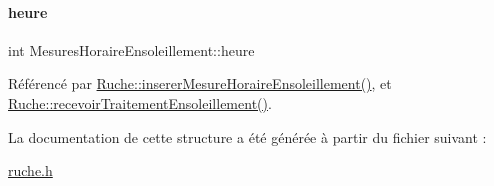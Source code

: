 \paragraph{\texorpdfstring{heure}{heure}}
{\footnotesize\ttfamily int Mesures\+Horaire\+Ensoleillement\+::heure}



Référencé par \hyperlink{class_ruche_a658234b9d96541d204b95b74556742b6}{Ruche\+::inserer\+Mesure\+Horaire\+Ensoleillement()}, et \hyperlink{class_ruche_a2ac5766ce8652084f034c498691488ea}{Ruche\+::recevoir\+Traitement\+Ensoleillement()}.



La documentation de cette structure a été générée à partir du fichier suivant \+:\begin{DoxyCompactItemize}
\item 
\hyperlink{ruche_8h}{ruche.\+h}\end{DoxyCompactItemize}
